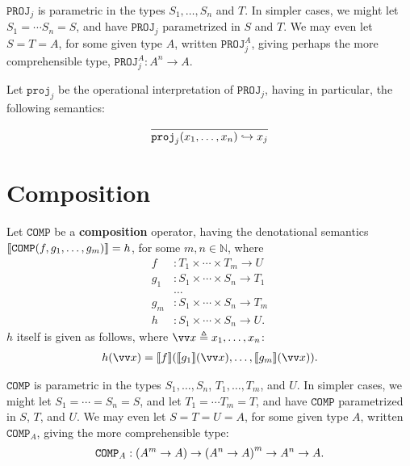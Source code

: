 \begin{remark} $\mathtt{PROJ}_j$ is parametric in the types $S_1,\ldots,S_n$
and $T$. In simpler cases, we might let $S_1 = \cdots S_n = S$, and have
$\mathtt{PROJ}_j$ parametrized in $S$ and $T$. We may even let $S = T = A$, for
some given type $A$, written $\mathtt{PROJ}_j^A$, giving perhaps the more
comprehensible type, $\mathtt{PROJ}_j^A : A^n \rightarrow A$. \end{remark}

\begin{definition} Let $\mathtt{proj}_j$ be the operational interpretation of
$\mathtt{PROJ}_j$, having in particular, the following semantics:\begin{align*}
%
\axiom{ \mathtt{proj}_j\p{x_1,\ldots,x_{n}} \goesto x_j }
%
\end{align*}

\end{definition}

\section{Composition}

\label{sec:generalised-composition}

\begin{definition} Let $\mathtt{COMP}$ be a \textbf{composition} operator,
having the denotational semantics ${\mathopen{}\left\llbracket{\mathtt{COMP}{\ensuremath{\mathopen{}\left({f,g_1,\ldots,g_m}\right)\mathclose{}}}}\right\rrbracket\mathclose{}} =
h$, for some $m,n\in \mathbb{N}$, where \begin{align*}
%
f & : T_1 \times \cdots \times T_m \rightarrow U \\
%
g_1 & : S_1 \times \cdots \times S_n \rightarrow T_1 \\
%
& \ldots \\
%
g_m & : S_1 \times \cdots \times S_n \rightarrow T_m \\
%
h & : S_1 \times \cdots \times S_n \rightarrow U.
%
\end{align*} $h$ itself is given as follows, where $\vect{x} \triangleq
x_1,\ldots,x_n$:\begin{align*}
%
h\p{\vect{x}} = \sem{f}\p{\sem{g_1}\p{\vect{x}}, \ldots,
\sem{g_m}\p{\vect{x}}}.
%
\end{align*}

\end{definition}

\begin{remark} $\mathtt{COMP}$ is parametric in the types $S_1,\ldots,S_n$,
$T_1,\ldots,T_m$, and $U$. In simpler cases, we might let $S_1 = \cdots = S_n =
S$, and let $T_1 = \cdots T_m = T$, and have $\mathtt{COMP}$ parametrized in
$S$, $T$, and $U$. We may even let $S=T=U=A$, for some given type $A$, written
$\mathtt{COMP}_A$, giving the more comprehensible type:\begin{align*}
%
\mathtt{COMP}_A : \p{A^m \rightarrow A} \rightarrow \p{A^n \rightarrow A}^m
\rightarrow A^n \rightarrow A.
%
\end{align*}\end{remark}

